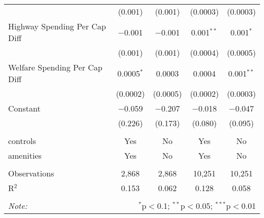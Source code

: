 \begin{table}[!htbp]
\begin{tabular}{@{\extracolsep{5pt}}lcccc}
  & (0.001) & (0.001) & (0.0003) & (0.0003) \\ 
  Highway Spending Per Cap Diff & $-$0.001 & $-$0.001 & 0.001$^{**}$ & 0.001$^{*}$ \\ 
  & (0.001) & (0.001) & (0.0004) & (0.0005) \\ 
  Welfare Spending Per Cap Diff & 0.0005$^{*}$ & 0.0003 & 0.0004 & 0.001$^{**}$ \\ 
  & (0.0002) & (0.0005) & (0.0002) & (0.0003) \\ 
  Constant & $-$0.059 & $-$0.207 & $-$0.018 & $-$0.047 \\ 
  & (0.226) & (0.173) & (0.080) & (0.095) \\ 
 \hline \\[-1.8ex] 
controls & Yes & No & Yes & No \\ 
amenities & Yes & No & Yes & No \\ 
\hline \\[-1.8ex] 
Observations & 2,868 & 2,868 & 10,251 & 10,251 \\ 
R$^{2}$ & 0.153 & 0.062 & 0.128 & 0.058 \\ 
\hline 
\hline \\[-1.8ex] 
\textit{Note:}  & \multicolumn{4}{r}{$^{*}$p$<$0.1; $^{**}$p$<$0.05; $^{***}$p$<$0.01} \\ 
\end{tabular} 
\end{table} 
